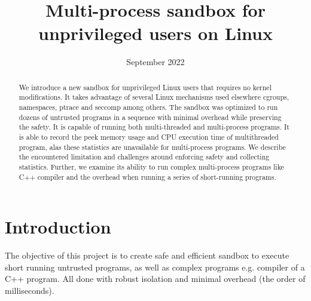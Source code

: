 \documentclass[licencjacka,en]{pracamgr}
\title{Multi-process sandbox for unprivileged users on Linux}
\date{September 2022}
\begin{document}
\renewcommand\textfraction{0}

\maketitle

\begin{abstract}
We introduce a new sandbox for unprivileged Linux users that requires no kernel modifications. It takes advantage of several Linux mechanisms used elsewhere cgroups, namespaces, ptrace and seccomp among others. The sandbox was optimized to run dozens of untrusted programs in a sequence with minimal overhead while preserving the safety. It is capable of running both multi-threaded and multi-process programs. It is able to record the peek memory usage and CPU execution time of multithreaded program, alas these statistics are unavailable for multi-process programs.
We describe the encountered limitation and challenges around enforcing safety and collecting statistics. Further, we examine its ability to run complex multi-process programs like C++ compiler and the overhead when running a series of short-running programs.
\end{abstract}

\tableofcontents

\chapter{Introduction}

The objective of this project is to create safe and efficient sandbox to execute short running untrusted programs, as well as complex programs e.g. compiler of a C++ program. All done with robust isolation and minimal overhead (the order of milliseconds).
\end{document}
